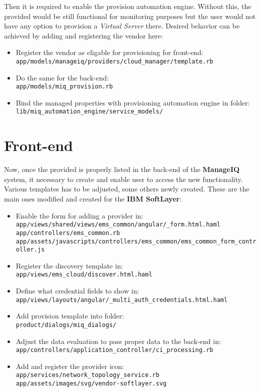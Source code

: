 Then it is required to enable the provision automation engine. Without this, the provided would be still functional for monitoring purposes but the user would not have any option to provision a \emph{Virtual Server} there. Desired behavior can be achieved by adding and registering the vendor here:

\begin{itemize}
	\item Register the vendor as eligable for provisioning for front-end: \\
	\small{\verb|app/models/manageiq/providers/cloud_manager/template.rb|}
	\item Do the same for the back-end: \\
	\small{\verb|app/models/miq_provision.rb|}
	\item Bind the managed properties with provisioning automation engine in folder: \\
	\small{\verb|lib/miq_automation_engine/service_models/|}
\end{itemize}
\section{Front-end}
\label{sec:Front-end}

Now, once the provided is properly listed in the back-end of the \textbf{ManageIQ} system, it necessary to create and enable user to access the new functionality. Various templates has to be adjusted, some others newly created. These are the main ones modified and created for the \textbf{IBM SoftLayer}:

\begin{itemize}
	\item Enable the form for adding a provider in:\\
	\small{\verb|app/views/shared/views/ems_common/angular/_form.html.haml| \\
		\verb|app/controllers/ems_common.rb| \\
		\verb|app/assets/javascripts/controllers/ems_common/ems_common_form_controller.js|}
	\item Register the discovery template in: \\
	\small{\verb|app/views/ems_cloud/discover.html.haml|}
	\item Define what credential fields to show in: \\
	\small{\verb|app/views/layouts/angular/_multi_auth_credentials.html.haml|}
	\item Add provision template into folder: \\
	\small{\verb|product/dialogs/miq_dialogs/|}
	\item Adjust the data evaluation to pass proper data to the back-end in: \\
	\small{\verb|app/controllers/application_controller/ci_processing.rb|}
	\item Add and register the provider icon: \\
	\small{\verb|app/services/network_topology_service.rb| \\
		\verb|app/assets/images/svg/vendor-softlayer.svg|}
\end{itemize}


